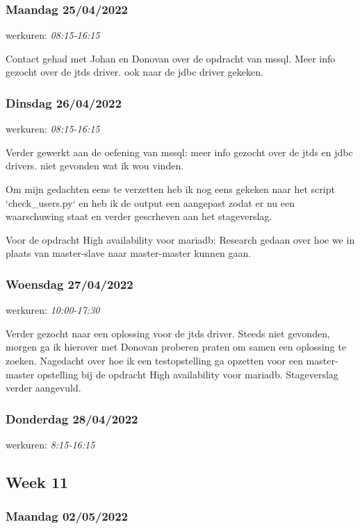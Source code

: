 \subsubsection{Maandag 25/04/2022}

werkuren: \emph{08:15-16:15}

Contact gehad met Johan en Donovan over de opdracht van \gls{mssql}. Meer info gezocht over de jtds driver. ook naar de jdbc driver gekeken.

\subsubsection{Dinsdag 26/04/2022}

werkuren: \emph{08:15-16:15}

Verder gewerkt aan de oefening van \gls{mssql}: meer info gezocht over de jtds en jdbc drivers. niet gevonden wat ik wou vinden.

Om mijn gedachten eens te verzetten heb ik nog eens gekeken naar het script `check\_users.py` en heb ik de output een aangepast zodat er nu een waarschuwing staat en verder gescrheven aan het stageverslag.

Voor de opdracht High availability voor mariadb: Research gedaan over hoe we in plaats van master-slave naar master-master kunnen gaan.


\subsubsection{Woensdag 27/04/2022}

werkuren: \emph{10:00-17:30}

Verder gezocht naar een oplossing voor de jtds driver. Steeds niet gevonden, morgen ga ik hierover met Donovan proberen praten om samen een oplossing te zoeken.
Nagedacht over hoe ik een testopstelling ga opzetten voor een master-master opstelling bij de opdracht High availability voor mariadb.
Stageverslag verder aangevuld.

\subsubsection{Donderdag 28/04/2022}

werkuren: \emph{8:15-16:15}

\subsection{Week 11}

\subsubsection{Maandag 02/05/2022}

